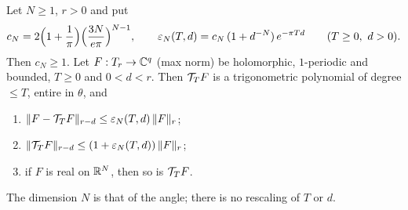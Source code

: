 \begin{lemma}\label{bpP:p11a:fourier-cutoff}
Let $N\ge1$, $r>0$ and put
\[c_N=2\Bigl(1+\frac1\pi\Bigr)\Bigl(\frac{3N}{e\pi}\Bigr)^{N-1},\qquad \varepsilon_N(T,d)=c_N\,(1+d^{-N})\,e^{-\pi Td}\qquad(T\ge0,\ d>0).\]
Then $c_N\ge1$. Let $F:T_r\to\mathbb{C}^q$ (max norm) be holomorphic, $1$-periodic and bounded, $T\ge0$ and $0<d<r$. Then $\mathcal T_TF$ is a trigonometric polynomial of degree $\le T$, entire in $\theta$, and
\begin{enumerate}[label=(\alph*)]
\item $\lVert F-\mathcal T_TF\rVert_{r-d}\le\varepsilon_N(T,d)\,\lVert F\rVert_{r}$;
\item $\lVert \mathcal T_TF\rVert_{r-d}\le(1+\varepsilon_N(T,d))\,\lVert F\rVert_{r}$;
\item if $F$ is real on $\mathbb{R}^N$, then so is $\mathcal T_TF$.
\end{enumerate}
The dimension $N$ is that of the angle; there is no rescaling of $T$ or $d$.
\end{lemma}
